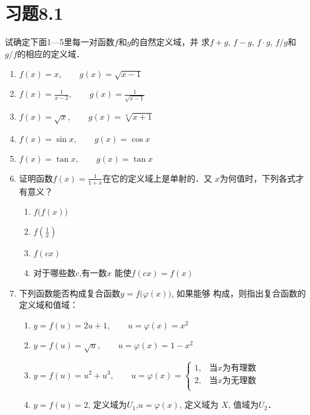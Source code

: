 \section*{习题8.1}

试确定下面1---5里每一对函数$f$和$g$的自然定义域，并
求$f+g$, $f-g$, $f\cdot g$, $f/g$和$g/f$的相应的定义域．

\begin{enumerate}
    \item $f(x)=x,\qquad g(x)=\sqrt{x-1}$
    \item $f(x)=\frac{1}{x-2},\qquad g(x)=\frac{1}{\sqrt{x-1}}$
        \item $f(x)=\sqrt{x},\qquad g(x)=\sqrt[4]{x+1}$
    \item $f(x)=\sin x,\qquad g(x)=\cos x$
    \item $f(x)=\tan x,\qquad g(x)=\tan x$
    \item 证明函数$f(x)=\frac{1}{1+x}$在它的定义域上是单射的．又
    $x$为何值时，下列各式才有意义？
    \begin{multicols}{2}
\begin{enumerate}
    \item $f\big(f(x)\big)$
    \item $f\left(\frac{1}{x}\right)$
    \item $f(cx)$
    \item 对于哪些数$c$,有一数$x$
    能使$f(cx)=f(x)$
\end{enumerate}        
    \end{multicols}

\item 下列函数能否构成复合函数$y=f\big(\varphi(x)\big)$, 如果能够
构成，则指出复合函数的定义域和值域：
\begin{enumerate}
    \item $y=f(u)=2u+1,\qquad u=\varphi(x)=x^2$
    \item $y=f(u)=\sqrt{u},\qquad u=\varphi(x)=1-x^2$
    \item $y=f(u)=u^2+u^3, \qquad u=\varphi(x)=\begin{cases}
        1,& \text{当$x$为有理数}\\
        2,&\text{当$x$为无理数}\\
    \end{cases}$
    \item $y=f(u)=2$, 定义域为$U_1$,\qquad  $u=\varphi(x)$, 定义域为
    $X$, 值域为$U_2$．
\end{enumerate}


\end{enumerate}
